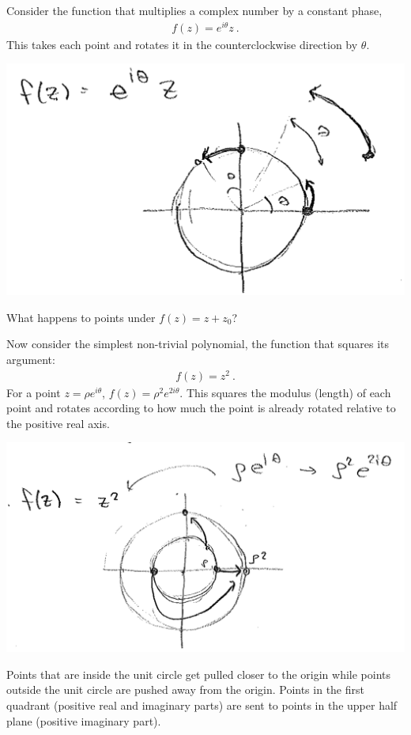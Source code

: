 \begin{example}
Consider the function that multiplies a complex number by a constant phase,
\begin{align}
	f(z) = e^{i\theta} z \ .
\end{align}
This takes each point and rotates it in the counterclockwise direction by $\theta$. 
\begin{center}
\includegraphics[width=.5\textwidth]{figures/lec13_map1.png}
\end{center}
\end{example}

\begin{exercise}
What happens to points under $f(z) = z+ z_0$?
\end{exercise}


\begin{example}
Now consider the simplest non-trivial polynomial, the function that squares its argument:
\begin{align}
	f(z) =  z^2 \ .
\end{align}
For a point $z = \rho e^{i\theta}$, $f(z)  = \rho^2 e^{2i\theta}$. This squares the modulus (length) of each point and rotates according to how much the point is already rotated relative to the positive real axis.
\begin{center}
\includegraphics[width=.7\textwidth]{figures/lec13_map2.png}
\end{center}
Points that are inside the unit circle get pulled closer to the origin while points outside the unit circle are pushed away from the origin.  Points in the first quadrant (positive real and imaginary parts) are sent to points in the upper half plane (positive imaginary part).
\end{example}

